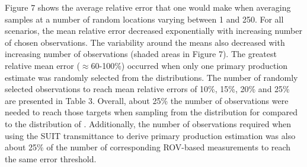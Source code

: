 Figure 7 shows the average relative error that one would make when averaging samples at a number of random locations varying between 1 and 250. For all scenarios, the mean relative error decreased exponentially with increasing number of chosen observations. The variability around the means also decreased with increasing number of observations (shaded areas in Figure 7). The greatest relative mean error ($\approx$60-100\%) occurred when only one primary production estimate was randomly selected from the distributions. The number of randomly selected observations to reach mean relative errors of 10\%, 15\%, 20\% and 25\% are presented in Table 3. Overall, about 25\% the number of observations were needed to reach those targets when sampling from the distribution for \ppmixing{} compared to the distribution of \ppunderice{}. Additionally, the number of observations required when using the SUIT transmittance to derive primary production estimation was also about 25\% of the number of corresponding ROV-based measurements to reach the same error threshold.